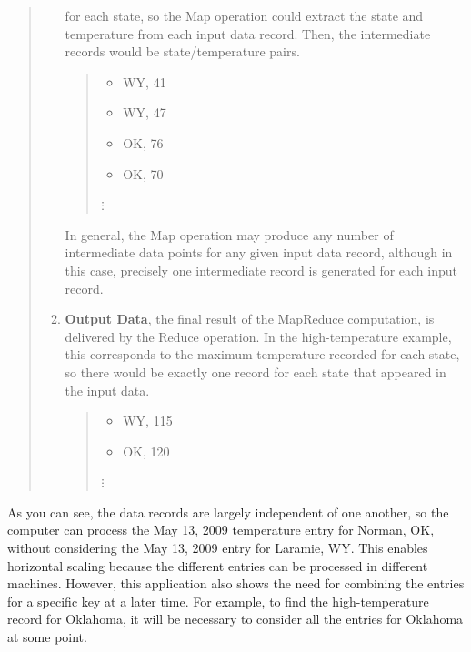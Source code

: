\begin{quote}
\begin{enumerate}
        for each state, so the Map operation could extract
        the state and temperature from each input data record.
        Then, the intermediate records would be state/temperature pairs.
        \begin {quote}
        \begin{itemize}
            \item \textsf{WY, 41}
            \item \textsf{WY, 47}
            \item \textsf{OK, 76}
            \item \textsf{OK, 70}
        \end{itemize}
        \hspace*{1cm}$\vdots$
        \end{quote}
        In general, the Map operation may produce any number of intermediate
        data points for any given input data record, although in this case,
        precisely one intermediate record is generated for each input record.
    \item \textbf{Output Data}, the final result of the MapReduce computation,
        is delivered by the Reduce operation.
        In the high-temperature example, this
        corresponds to the maximum temperature recorded for each state, so
        there would be exactly one record for each state that appeared in the input data.
        \begin {quote}
        \begin{itemize}
            \item \textsf{WY, 115}
            \item \textsf{OK, 120}
        \end{itemize}
        \hspace*{1cm}$\vdots$
        \end{quote}
\end{enumerate}
\end{quote}
As you can see, the data records are largely independent of one another, so the computer
can process the May 13, 2009 temperature entry for Norman, OK, without considering the
May 13, 2009 entry for Laramie, WY.  This enables horizontal scaling because the
different entries can be processed in different machines.
However, this application also shows the need for combining
the entries for a specific key at a later time.  For example,
to find the high-temperature record for Oklahoma, it will be
necessary to consider all the entries for Oklahoma at some
point.

